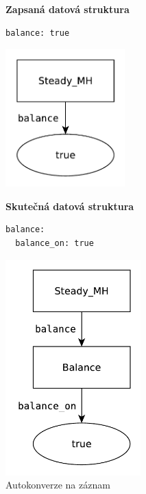 \documentclass[FM,bw,DP]{tulthesis}
\begin{document}
\begin{figure}[ht]
\begin{minipage}[t]{0.45\linewidth}
\vspace{0pt}
\textbf{Zapsaná datová struktura}\\
\vspace{-5pt}
\begin{lstlisting}
balance: true

\end{lstlisting}
\vspace*{-20pt}
\begin{center}
\includegraphics[height=150pt]{../img/autoconversion_record_before.pdf}
\end{center}
\end{minipage}
\quad
\begin{minipage}[t]{0.45\linewidth}
\vspace{0pt}
\textbf{Skutečná datová struktura}\\
\vspace{-5pt}
\begin{lstlisting}
balance:
  balance_on: true
\end{lstlisting}
\vspace*{-20pt}
\begin{center}
\includegraphics[height=235pt]{../img/autoconversion_record_after.pdf}
\end{center}
\end{minipage}
\caption{Autokonverze na záznam}
\label{img:autoconversion_record}
\end{figure}	
\end{document}
